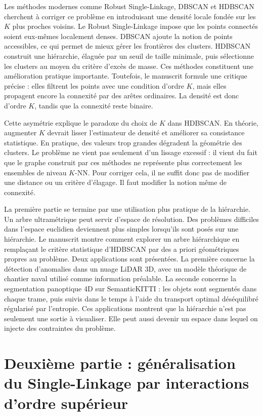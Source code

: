 Les méthodes modernes comme Robust Single-Linkage, DBSCAN et HDBSCAN cherchent à corriger ce problème en introduisant une densité locale fondée sur les $K$ plus proches voisins. Le Robust Single-Linkage impose que les points connectés soient eux-mêmes localement denses. DBSCAN ajoute la notion de points accessibles, ce qui permet de mieux gérer les frontières des clusters. HDBSCAN construit une hiérarchie, élaguée par un seuil de taille minimale, puis sélectionne les clusters au moyen du critère d'excès de masse. Ces méthodes constituent une amélioration pratique importante. Toutefois, le manuscrit formule une critique précise : elles filtrent les points avec une condition d'ordre $K$, mais elles propagent encore la connexité par des arêtes ordinaires. La densité est donc d'ordre $K$, tandis que la connexité reste binaire.

Cette asymétrie explique le paradoxe du choix de $K$ dans HDBSCAN. En théorie, augmenter $K$ devrait lisser l'estimateur de densité et améliorer sa consistance statistique. En pratique, des valeurs trop grandes dégradent la géométrie des clusters. Le problème ne vient pas seulement d'un lissage excessif : il vient du fait que le graphe construit par ces méthodes ne représente plus correctement les ensembles de niveau $K$-NN. Pour corriger cela, il ne suffit donc pas de modifier une distance ou un critère d'élagage. Il faut modifier la notion même de connexité.

La première partie se termine par une utilisation plus pratique de la hiérarchie. Un arbre ultramétrique peut servir d'espace de résolution. Des problèmes difficiles dans l'espace euclidien deviennent plus simples lorsqu'ils sont posés sur une hiérarchie. Le manuscrit montre comment explorer un arbre hiérarchique en remplaçant le critère statistique d'HDBSCAN par des a priori géométriques propres au problème. Deux applications sont présentées. La première concerne la détection d'anomalies dans un nuage LiDAR 3D, avec un modèle théorique de chantier naval utilisé comme information préalable. La seconde concerne la segmentation panoptique 4D sur SemanticKITTI : les objets sont segmentés dans chaque trame, puis suivis dans le temps à l'aide du transport optimal déséquilibré régularisé par l'entropie. Ces applications montrent que la hiérarchie n'est pas seulement une sortie à visualiser. Elle peut aussi devenir un espace dans lequel on injecte des contraintes du problème.

\section*{Deuxième partie : généralisation du Single-Linkage par interactions d'ordre supérieur}

